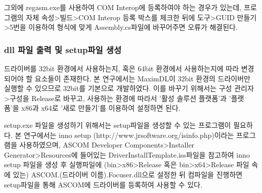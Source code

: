 그외에 regasm.exe를 사용하여 COM Interop에 등록하여야 하는 경우가 있는데, 프로그램의 자체 속성>빌드>COM Interop 등록 박스를 체크한 뒤에 도구>GUID 만들기>5번을 이용하여 형식에 맞게 Assembly.cs파일에 바꾸어주면 오류가 해결된다.

\subsubsection{dll 파일 출력 및 setup파일 생성}
드라이버를 32bit 환경에서 사용하는지, 혹은 64bit 환경에서 사용하는지에 따라 변경되어야 할 요소들이 존재한다. 본 연구에서는 MaximDL이 32bit 환경의 드라이버만 실행할 수 있으므로 32bit를 기본으로 개발하였다. 이를 바꾸기 위해서는 구성 관리자>구성을 Release로 바꾸고, 사용하는 환경에 따라서 '활성 솔루션 플랫폼'과 '플랫폼'을 x86과 x64로 '새로 만들기'를 이용하여 설정하면 된다.

setup.exe 파일을 생성하기 위해서는 setup파일을 생성할 수 있는 프로그램이 필요하다. 본 연구에서는 inno setup (http://www.jrsoftware.org/isinfo.php)이라는 프로그램을 사용하였으며, ASCOM Developer Components>Installer Generator>Resources에 들어있는 DriverInstallTemplate.iss파일을 참고하여 inno setup 파일을 생성 후 실행파일에 (bin>x86>Release 혹은 bin>x64>Release 파일 속에 있는) ASCOM.(드라이버 이름).Focuser.dll으로 설정한 뒤 컴파일을 진행하면 setup파일을 통해 ASCOM에 드라이버를 등록하여 사용할 수 있다.
